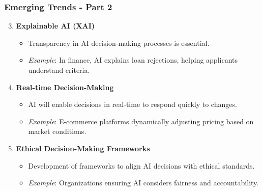 \documentclass[aspectratio=169]{beamer}
\begin{document}
\begin{frame}[fragile]
    \frametitle{Emerging Trends - Part 2}
    \begin{enumerate}
        \setcounter{enumi}{2} %
        \item \textbf{Explainable AI (XAI)}
            \begin{itemize}
                \item Transparency in AI decision-making processes is essential.
                \item \textit{Example}: In finance, AI explains loan rejections, helping applicants understand criteria.
            \end{itemize}
        
        \item \textbf{Real-time Decision-Making}
            \begin{itemize}
                \item AI will enable decisions in real-time to respond quickly to changes.
                \item \textit{Example}: E-commerce platforms dynamically adjusting pricing based on market conditions.
            \end{itemize}

        \item \textbf{Ethical Decision-Making Frameworks}
            \begin{itemize}
                \item Development of frameworks to align AI decisions with ethical standards.
                \item \textit{Example}: Organizations ensuring AI considers fairness and accountability.
            \end{itemize}
    \end{enumerate}
\end{frame}
\end{document}
